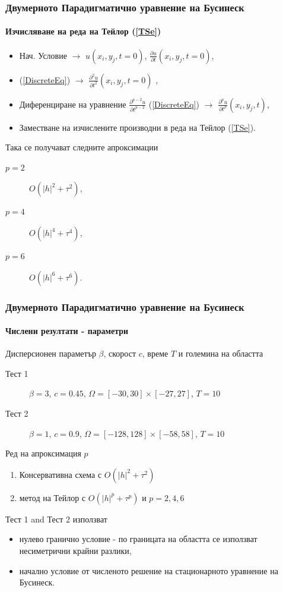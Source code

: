 \documentclass{beamer}
\newcommand{\rf}[1]{(\ref{#1})}
\begin{document}
\begin{frame}
\frametitle{Двумерното Парадигматично уравнение на Бусинеск}
\framesubtitle{Изчисляване на реда на Тейлор \rf{TSe}}
\begin{itemize}
 \item Нач. Условие $\rightarrow$ $u(x_i, y_j, t=0)$, $\frac{ \partial u }{ \partial t }(x_i, y_j, t=0)$,
 \item \rf{DiscreteEq} $\rightarrow$ $\frac{ \partial^2 u }{ \partial t^2 }(x_i, y_j, t=0)$ ,
 \item Диференциране на уравнение $\frac{ \partial^{p-2} u }{ \partial t^{p-2} }$ \rf{DiscreteEq} $\rightarrow$  $\frac{ \partial^p u }{ \partial t^p }(x_i, y_j, t)$,
 \item Заместване на изчислените производни в реда на Тейлор \rf{TSe}.
\end{itemize}


Така се получават следните апроксимации
\begin{description}
 \item[$p=2$] $O(|h|^2 + \tau^2)$,
 \item[$p=4$] $O(|h|^4 + \tau^4)$,
 \item[$p=6$] $O(|h|^6 + \tau^6)$.
\end{description}

\end{frame}

\begin{frame}
\frametitle{Двумерното Парадигматично уравнение на Бусинеск}
\framesubtitle{Числени резултати - параметри}

Дисперсионен параметър $\beta$, скорост $c$, време $T$ и големина на областта
\begin{description}
 \item[Тест 1] $\beta = 3$, $c = 0.45$, $\Omega = [-30, 30] \times [-27, 27]$, $T = 10$
 \item[Тест 2] $\beta = 1$, $c = 0.9$, $\Omega = [-128, 128] \times [-58, 58]$, $T = 10$
\end{description}

Ред на апроксимация $p$
\begin{enumerate}
  \item Консервативна схема с $O(|h|^2 + \tau^2)$
  \item метод на Тейлор с $O(|h|^p + \tau^p)$ и $p = 2, 4, 6$
\end{enumerate}

Тест 1 and Тест 2 използват 
\begin{itemize} 
\item нулево гранично условие - по границата на областта се използват несиметрични крайни разлики,
\item начално условие от численото решение на стационарното уравнение на Бусинеск.
\end{itemize}
\end{frame}
\end{document}

